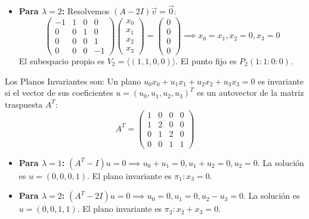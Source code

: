 {\begin{itemize}
    \item \textbf{Para $\lambda = 2$:} Resolvemos $(A-2I)\vec{v} = \vec{0}$:
    \[ \begin{pmatrix} -1 & 1 & 0 & 0 \\ 0 & 0 & 1 & 0 \\ 0 & 0 & 0 & 1 \\ 0 & 0 & 0 & -1 \end{pmatrix} \begin{pmatrix} x_0 \\ x_1 \\ x_2 \\ x_3 \end{pmatrix} = \begin{pmatrix} 0 \\ 0 \\ 0 \\ 0 \end{pmatrix} \implies x_0=x_1, x_2=0, x_3=0 \]
    El subespacio propio es $V_2 = \langle (1,1,0,0) \rangle$. El punto fijo es \textbf{$P_2(1:1:0:0)$}.
\end{itemize}

Los Planos Invariantes son:
Un plano $u_0x_0 + u_1x_1 + u_2x_2 + u_3x_3 = 0$ es invariante si el vector de sus coeficientes $u = (u_0, u_1, u_2, u_3)^T$ es un autovector de la matriz traspuesta $A^T$:
\[ A^T = \begin{pmatrix} 1 & 0 & 0 & 0 \\ 1 & 2 & 0 & 0 \\ 0 & 1 & 2 & 0 \\ 0 & 0 & 1 & 1 \end{pmatrix} \]

\begin{itemize}
    \item \textbf{Para $\lambda = 1$:} $(A^T-I)u = 0 \implies u_0+u_1=0, u_1+u_2=0, u_2=0$. La solución es $u = (0,0,0,1)$. 
    El plano invariante es \textbf{$\pi_1: x_3 = 0$}.
    \item \textbf{Para $\lambda = 2$:} $(A^T-2I)u = 0 \implies u_0=0, u_1=0, u_2-u_3=0$. La solución es $u = (0,0,1,1)$. 
    El plano invariante es \textbf{$\pi_2: x_2 + x_3 = 0$}.
\end{itemize}

}
